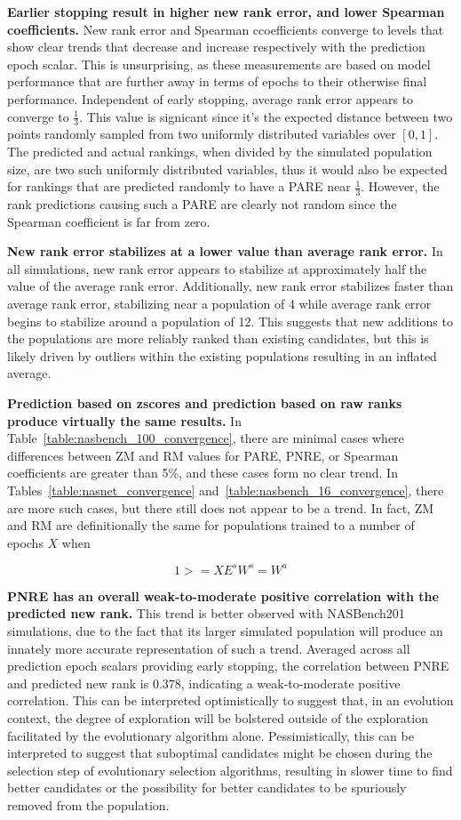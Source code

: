 \documentclass[twocolumn]{article}
\begin{document}
\textbf{Earlier stopping result in higher new rank error, and lower Spearman coefficients.}
New rank error and Spearman ccoefficients converge to levels that show clear trends that decrease and increase respectively with the prediction epoch scalar.
This is unsurprising, as these measurements are based on model performance that are further away in terms of epochs to their
otherwise final performance. 
Independent of early stopping, average rank error appears to converge to $\frac{1}{3}$.
This value is signicant since it's the expected distance between two points randomly sampled from two uniformly distributed variables over $[0, 1]$.
The predicted and actual rankings, when divided by the simulated population size, are two such uniformly distributed variables, 
thus it would also be expected for rankings that are predicted randomly to have a PARE near $\frac{1}{3}$.
However, the rank predictions causing such a PARE are clearly not random since the Spearman coefficient is far from zero.

\textbf{New rank error stabilizes at a lower value than average rank error.}
In all simulations, new rank error appears to stabilize at approximately half the value of the average rank error.
Additionally, new rank error stabilizes faster than average rank error, stabilizing near a population of 4 while
average rank error begins to stabilize around a population of 12.
This suggests that new additions to the populations are more reliably ranked than existing candidates,
but this is likely driven by outliers within the existing populations resulting in an inflated average.

\textbf{Prediction based on zscores and prediction based on raw ranks produce virtually the same results.}
In Table~\ref{table:nasbench_100_convergence}, there are minimal cases where differences between ZM and RM values for PARE, PNRE, or Spearman coefficients are greater than 5\%,
and these cases form no clear trend.
In Tables~\ref{table:nasnet_convergence} and~\ref{table:nasbench_16_convergence}, there are more such cases, but there still does not appear to be a trend.
In fact, ZM and RM are definitionally the same for populations trained to a number of epochs $X$ when

\[1 >= XE^{s}W^{s} = W^{a}\]

\textbf{PNRE has an overall weak-to-moderate positive correlation with the predicted new rank.}
This trend is better observed with NASBench201 simulations, due to the fact that its larger simulated population will produce an innately more accurate
representation of such a trend. 
Averaged across all prediction epoch scalars providing early stopping, the correlation between PNRE and predicted new rank is $0.378$,
indicating a weak-to-moderate positive correlation. 
This can be interpreted optimistically to suggest that, in an evolution context, the degree of exploration will be bolstered
outside of the exploration facilitated by the evolutionary algorithm alone. 
Pessimistically, this can be interpreted to suggest that suboptimal candidates might be chosen during the selection step of
evolutionary selection algorithms, resulting in slower time to find better candidates or the possibility for better candidates
to be spuriously removed from the population.
\end{document}
